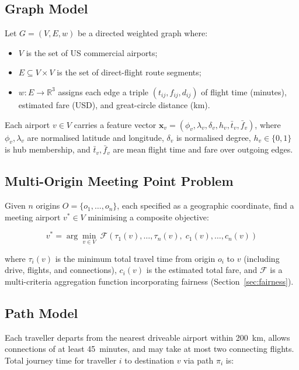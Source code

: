 \documentclass[review]{elsarticle}
\begin{document}
\subsection{Graph Model}

Let $G = (V, E, w)$ be a directed weighted graph where:
\begin{itemize}
    \item $V$ is the set of US commercial airports;
    \item $E \subseteq V \times V$ is the set of direct-flight route segments;
    \item $w: E \to \mathbb{R}^3$ assigns each edge a triple $(t_{ij}, f_{ij}, d_{ij})$ of flight time (minutes), estimated fare (USD), and great-circle distance (km).
\end{itemize}

Each airport $v \in V$ carries a feature vector $\mathbf{x}_v = (\phi_v, \lambda_v, \delta_v, h_v, \bar{t}_v, \bar{f}_v)$, where $\phi_v, \lambda_v$ are normalised latitude and longitude, $\delta_v$ is normalised degree, $h_v \in \{0,1\}$ is hub membership, and $\bar{t}_v, \bar{f}_v$ are mean flight time and fare over outgoing edges.

\subsection{Multi-Origin Meeting Point Problem}

Given $n$ origins $O = \{o_1, \ldots, o_n\}$, each specified as a geographic coordinate, find a meeting airport $v^* \in V$ minimising a composite objective:

\begin{equation}
    v^* = \arg\min_{v \in V}\ \mathcal{F}\!\left(\tau_1(v), \ldots, \tau_n(v),\; c_1(v), \ldots, c_n(v)\right)
    \label{eq:objective}
\end{equation}

where $\tau_i(v)$ is the minimum total travel time from origin $o_i$ to $v$ (including drive, flights, and connections), $c_i(v)$ is the estimated total fare, and $\mathcal{F}$ is a multi-criteria aggregation function incorporating fairness (Section~\ref{sec:fairness}).

\subsection{Path Model}

Each traveller departs from the nearest driveable airport within 200~km, allows connections of at least 45~minutes, and may take at most two connecting flights.
Total journey time for traveller $i$ to destination $v$ via path $\pi_i$ is:
\end{document}
